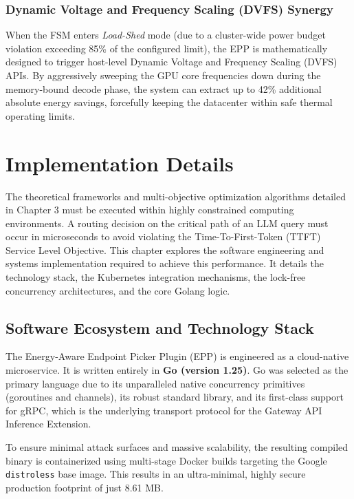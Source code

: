 \documentclass[12pt,a4paper,oneside]{report}
\begin{document}
\subsection{Dynamic Voltage and Frequency Scaling (DVFS) Synergy}
When the FSM enters \textit{Load-Shed} mode (due to a cluster-wide power budget violation exceeding 85\% of the configured limit), the EPP is mathematically designed to trigger host-level Dynamic Voltage and Frequency Scaling (DVFS) APIs. By aggressively sweeping the GPU core frequencies down during the memory-bound decode phase, the system can extract up to 42\% additional absolute energy savings, forcefully keeping the datacenter within safe thermal operating limits.


\chapter{Implementation Details}
\label{ch:implementation}

The theoretical frameworks and multi-objective optimization algorithms detailed in Chapter 3 must be executed within highly constrained computing environments. A routing decision on the critical path of an LLM query must occur in microseconds to avoid violating the Time-To-First-Token (TTFT) Service Level Objective. This chapter explores the software engineering and systems implementation required to achieve this performance. It details the technology stack, the Kubernetes integration mechanisms, the lock-free concurrency architectures, and the core Golang logic.

\section{Software Ecosystem and Technology Stack}
\label{sec:impl_stack}

The Energy-Aware Endpoint Picker Plugin (EPP) is engineered as a cloud-native microservice. It is written entirely in \textbf{Go (version 1.25)}. Go was selected as the primary language due to its unparalleled native concurrency primitives (goroutines and channels), its robust standard library, and its first-class support for gRPC, which is the underlying transport protocol for the Gateway API Inference Extension. 

To ensure minimal attack surfaces and massive scalability, the resulting compiled binary is containerized using multi-stage Docker builds targeting the Google \texttt{distroless} base image. This results in an ultra-minimal, highly secure production footprint of just 8.61 MB.
\end{document}
